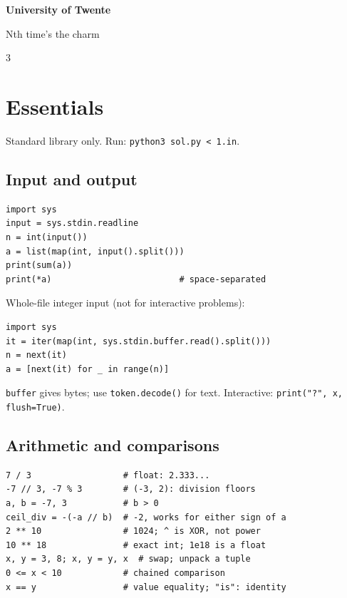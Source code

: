 \documentclass[9pt]{extarticle}
\newcommand{\university}{University of Twente}
\newcommand{\teamname}{Nth time's the charm}
\let\referenceSubsection\subsection
\renewcommand{\subsection}{\needspace{4\baselineskip}\referenceSubsection}
\newcommand{\hint}[1]{{\small #1\par}}
\newcommand{\sheetstyle}{%
  \fontsize{9}{10}\selectfont
  \setlength{\parskip}{1pt}%
  \setlength{\multicolsep}{3pt}%
  \setlength{\abovedisplayskip}{3pt}%
  \setlength{\belowdisplayskip}{3pt}%
  \setlength{\abovedisplayshortskip}{1pt}%
  \setlength{\belowdisplayshortskip}{2pt}%
  \setlength{\jot}{1pt}}
\newif\ifreferencecontent
\begin{document}
\thispagestyle{empty}
\null\vfill
\begin{center}
  {\fontsize{30}{36}\selectfont\bfseries\university\par}
  \vspace{12mm}
  {\fontsize{26}{32}\selectfont\teamname\par}
\end{center}
\vfill\null
\clearpage
\restoregeometry
\referencecontenttrue
\setcounter{page}{21}

\begin{multicols*}{3}
\raggedcolumns
\raggedright

\begingroup\sheetstyle

\par\endgroup

\section{Essentials}
Standard library only. Run: \texttt{python3 sol.py < 1.in}.

\subsection{Input and output}
\begin{lstlisting}[label=py:io]
import sys
input = sys.stdin.readline
n = int(input())
a = list(map(int, input().split()))
print(sum(a))
print(*a)                         # space-separated
\end{lstlisting}
\hint{Whole-file integer input (not for interactive problems):}
\begin{lstlisting}[label=py:tokens]
import sys
it = iter(map(int, sys.stdin.buffer.read().split()))
n = next(it)
a = [next(it) for _ in range(n)]
\end{lstlisting}
\hint{\texttt{buffer} gives bytes; use \texttt{token.decode()} for text.
Interactive: \texttt{print("?", x, flush=True)}.}

\subsection{Arithmetic and comparisons}
\begin{lstlisting}[label=py:arithmetic]
7 / 3                  # float: 2.333...
-7 // 3, -7 % 3        # (-3, 2): division floors
a, b = -7, 3           # b > 0
ceil_div = -(-a // b)  # -2, works for either sign of a
2 ** 10                # 1024; ^ is XOR, not power
10 ** 18               # exact int; 1e18 is a float
x, y = 3, 8; x, y = y, x  # swap; unpack a tuple
0 <= x < 10            # chained comparison
x == y                 # value equality; "is": identity
\end{lstlisting}


\end{multicols*}
\end{document}
